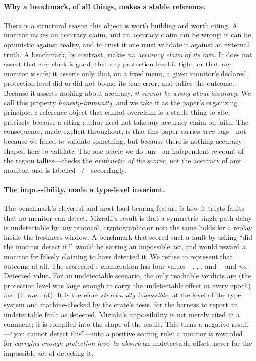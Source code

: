 \paragraph{Why a benchmark, of all things, makes a stable reference.}
There is a structural reason this object is worth building and worth citing. A
monitor makes an accuracy claim, and an accuracy claim can be wrong: it can be
optimistic against reality, and to trust it one must validate it against an
external truth. A benchmark, by contrast, makes \emph{no accuracy claim of its
own}. It does not assert that any clock is good, that any protection level is
tight, or that any monitor is safe; it asserts only that, on a fixed menu, a given
monitor's declared protection level did or did not bound its true error, and
tallies the outcome. Because it asserts nothing about accuracy, \emph{it cannot be
wrong about accuracy}. We call this property \emph{honesty-immunity}, and we take
it as the paper's organizing principle: a reference object that cannot overclaim
is a stable thing to cite, precisely because a citing author need
not take any accuracy claim on faith. The consequence, made explicit throughout,
is that this paper carries \emph{zero} \Validated{} tags---not because we failed to
validate something, but because there is nothing accuracy-shaped here to validate.
The one oracle we do run---an independent re-count of the region tallies---checks
the \emph{arithmetic of the scorer}, not the accuracy of any monitor, and is
labelled \Modelled{}~/~ accordingly.

\paragraph{The impossibility, made a type-level invariant.}
The benchmark's cleverest and most load-bearing feature is how it treats faults
that no monitor can detect. Mizrahi's result \citep{mizrahi7384} is that a
symmetric single-path delay is undetectable by any protocol, cryptographic or not;
the same holds for a replay inside the freshness window. A benchmark that scored
such a fault by asking ``did the monitor detect it?'' would be scoring an
impossible act, and would reward a monitor for falsely claiming to have detected
it. We refuse to represent that outcome at all. The scorecard's 
enumeration has four values---\CovPass{}, \CovFail{}, \Absorbed{}, and
\Unabsorbed{}---and \emph{no} \textsf{Detected} value. For an undetectable
scenario, the only reachable verdicts are \Absorbed{} (the protection level was
large enough to carry the undetectable offset at every epoch) and \Unabsorbed{}
(it was not). It is therefore \emph{structurally impossible}, at the level of the
type system and machine-checked by the crate's tests, for the harness to report an
undetectable fault as detected. Mizrahi's impossibility is not merely cited in a
comment; it is compiled into the shape of the result. This turns a negative
result---``you cannot detect this''---into a positive scoring rule: a monitor is
rewarded for \emph{carrying enough protection level to absorb} an undetectable
offset, never for the impossible act of detecting it.

